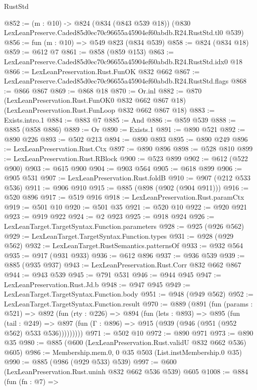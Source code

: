 \begin{lexlean}{RustStd}
\begin{coremodule}
@852 := (m : @10) ->
  @824
    (@834 (@843 @539 @18))
    (@830 LexLeanPreserve.Caded85d0ec70c96655a45904ef60abdb.R24.RustStd.tl0 @539)
@856 := fun (m : @10) => @549 @823 (@834 @539)
@858 := @824 (@834 @18)
@859 := @612 @7
@861 := @858 (@859 @153)
@863 := LexLeanPreserve.Caded85d0ec70c96655a45904ef60abdb.R24.RustStd.idx0 @18
@866 := LexLeanPreservation.Rust.FunOK @832 @662
@867 := LexLeanPreserve.Caded85d0ec70c96655a45904ef60abdb.R24.RustStd.flags
@868 := @866 @867
@869 := @868 @18
@870 := Or.inl
@882 := @870
    (LexLeanPreservation.Rust.FunOK0 @832 @662 @867 @18)
    (LexLeanPreservation.Rust.FunLoop @832 @662 @867 @18)
@883 := Exists.intro.{1}
@884 := @883 @7
@885 := And
@886 := @859 @539
@888 := @885 (@858 @886)
@889 := Or
@890 := Exists.{1}
@891 := @890 @521
@892 := @890 @226
@893 := @502 @213
@894 := @890 @893
@895 := @890 @249
@896 := LexLeanPreservation.Rust.Ctx
@897 := @890 @896
@898 := @528 @810
@899 := LexLeanPreservation.Rust.RBlock
@900 := @523 @899
@902 := @612 (@522 @900)
@903 := @615 @900
@904 := @903 @564
@905 := @618 @899
@906 := @905 @531
@907 := LexLeanPreservation.Rust.foldB
@910 := @907 (@212 @533 @536)
@911 := @906 @910
@915 := @885 (@898 (@902 (@904 @911)))
@916 := @520 @896
@917 := @519 @916
@918 := LexLeanPreservation.Rust.paramCtx
@919 := @501 @10
@920 := @501 @35
@921 := @520 @10
@922 := @920 @921
@923 := @919 @922
@924 := @2 @923
@925 := @918 @924
@926 := LexLeanTarget.TargetSyntax.Function.parameters
@928 := @925 (@926 @562)
@929 := LexLeanTarget.TargetSyntax.Function.types
@931 := @928 (@929 @562)
@932 := LexLeanTarget.RustSemantics.patternsOf
@933 := @932 @564
@935 := @917 (@931 @933)
@936 := @612 @896
@937 := @936 @539
@939 := @885 (@935 @937)
@943 := LexLeanPreservation.Rust.Corr @832 @662 @867
@944 := @943 @539
@945 := @791 @531
@946 := @944 @945
@947 := LexLeanPreservation.Rust.Jd.b
@948 := @947 @945
@949 := LexLeanTarget.TargetSyntax.Function.body
@951 := @948 (@949 @562)
@952 := LexLeanTarget.TargetSyntax.Function.result
@970 := @889
    (@891
      (fun (params : @521) =>
      @892
        (fun (rty : @226) =>
        @894
          (fun (lets : @893) =>
          @895
            (fun (tail : @249) =>
            @897 (fun (Γ : @896) => @915 (@939 (@946 (@951 (@952 @562) @533 @536)))))))))
@971 := @502 @10
@972 := @890 @971
@973 := @890 @35
@980 := @885 (@600 (LexLeanPreservation.Rust.validU @832 @662 @536) @605)
@986 := Membership.mem.{0, 0} @35 @503 (List.instMembership.{0} @35)
@990 := @885 (@986 (@929 @533) @539)
@997 := @600 (LexLeanPreservation.Rust.uninh @832 @662 @536 @539) @605
@1008 := @884
    (fun (fn : @7) =>

\end{coremodule}
\end{lexlean}
